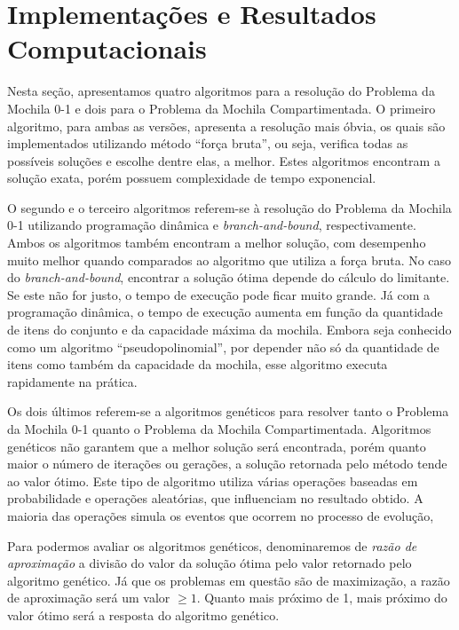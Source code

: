 \pagestyle{plain}

\chapter{Implementações e Resultados Computacionais}\label{sec:resultados}

Nesta seção, apresentamos quatro algoritmos para a resolução do Problema da Mochila 0-1 e dois para o Problema da Mochila Compartimentada. O primeiro algoritmo, para ambas as versões, apresenta a resolução mais óbvia, os quais são implementados utilizando método ``força bruta'', ou seja, verifica todas as possíveis soluções e escolhe dentre elas, a melhor. Estes algoritmos encontram a solução exata, porém possuem complexidade de tempo exponencial.

O segundo e o terceiro algoritmos referem-se à resolução do Problema da Mochila 0-1 utilizando programação dinâmica e \textit{branch-and-bound}, respectivamente. Ambos os algoritmos também encontram a melhor solução, com desempenho muito melhor quando comparados ao algoritmo que utiliza a força bruta. No caso do \textit{branch-and-bound}, encontrar a solução ótima depende do cálculo do limitante. Se este não for justo, o tempo de execução pode ficar muito grande. Já com a programação dinâmica, o tempo de execução aumenta em função da quantidade de itens do conjunto e da capacidade máxima da mochila. Embora seja conhecido como um algoritmo ``pseudopolinomial'', por depender não só da quantidade de itens como também da capacidade da mochila, esse algoritmo executa rapidamente na prática. 

Os dois últimos referem-se a algoritmos genéticos para resolver tanto o Problema da Mochila 0-1 quanto o Problema da Mochila Compartimentada. Algoritmos genéticos não garantem que a melhor solução será encontrada, porém quanto maior o número de iterações ou gerações, a solução retornada pelo método tende ao valor ótimo.  Este tipo de algoritmo utiliza várias operações baseadas em probabilidade e operações aleatórias, que influenciam no resultado obtido. A maioria das operações simula os eventos que ocorrem no processo de evolução, 

Para podermos avaliar os algoritmos genéticos, denominaremos de {\it razão de aproximação} a divisão do valor da solução ótima pelo valor retornado pelo algoritmo genético. Já que os problemas em questão são de maximização, a razão de aproximação será um valor $\geq 1$. Quanto mais próximo de 1, mais próximo do valor ótimo será a resposta do algoritmo genético.


